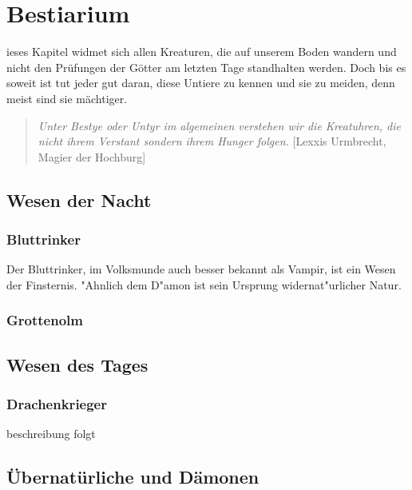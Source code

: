 \chapter{Bestiarium}
\label{bestiarium}
ieses Kapitel
widmet sich allen Kreaturen, die auf unserem Boden wandern und nicht
den Prüfungen der Götter am letzten Tage standhalten werden. Doch
bis es soweit ist tut jeder gut daran, diese Untiere zu kennen und
sie zu meiden, denn meist sind sie mächtiger.
\begin{quotation}
\par\textit{\glqq Unter Bestye oder Untyr im algemeinen
verstehen wir die Kreatuhren, die nicht ihrem Verstant sondern ihrem
Hunger folgen.\grqq} [\mbox{Lexxis} \mbox{Urmbrecht}, Magier der
Hochburg]
\end{quotation}
\section{Wesen der Nacht}

\subsection{Bluttrinker}
\par Der Bluttrinker, im Volksmunde auch besser bekannt als Vampir,
ist ein Wesen der Finsternis. "Ahnlich dem D"amon ist sein Ursprung
widernat"urlicher Natur.

\subsection{Grottenolm}

\section{Wesen des Tages}
\subsection{Drachenkrieger}
\par beschreibung folgt

\section{Übernatürliche und Dämonen}

